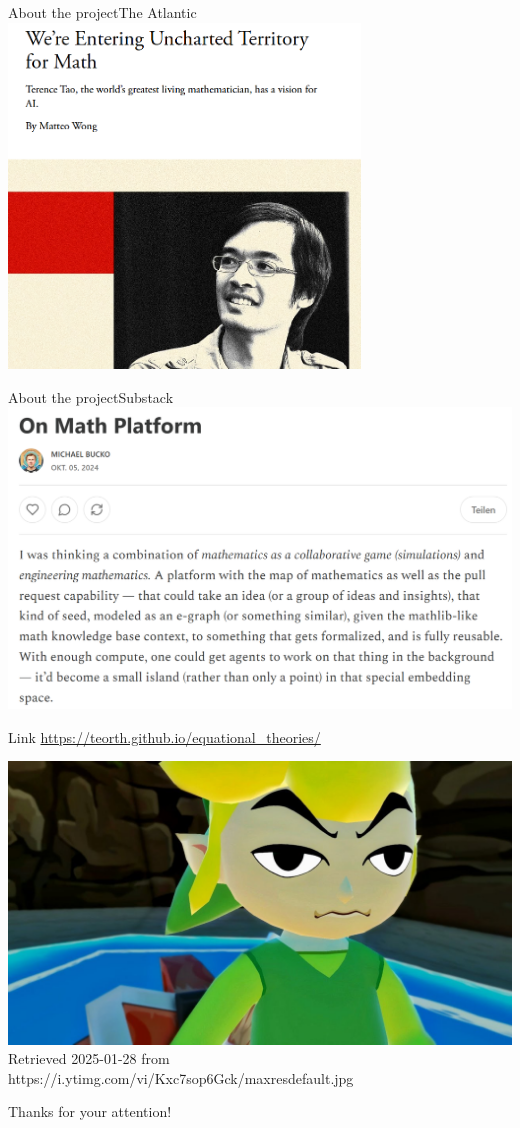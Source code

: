 \documentclass{beamer}
\begin{document}
\begin{frame}{About the project}{The Atlantic}
\includegraphics[width=0.7\textwidth]{atlantic}
\end{frame}


\begin{frame}{About the project}{Substack}
\includegraphics[width=\textwidth]{substack}
\end{frame}

\begin{frame}{Link}
\url{https://teorth.github.io/equational_theories/}
\vfill

\includegraphics[width=\textwidth]{link}
\tiny Retrieved 2025-01-28 from https://i.ytimg.com/vi/Kxc7sop6Gck/maxresdefault.jpg
\vfill

\Huge Thanks for your attention!
\end{frame}
\end{document}
